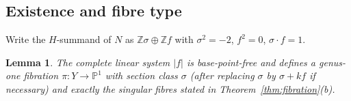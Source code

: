 \documentclass[11pt]{article}
\newtheorem{lemma}[theorem]{Lemma}
\newcommand{\PP}{\mathbb{P}}
\newcommand{\bZ}{\mathbb{Z}}
\begin{document}
\subsection{Existence and fibre type}

Write the $H$-summand of $N$ as $\bZ\sigma\oplus\bZ f$ with
$\sigma^2=-2$, $f^2=0$, $\sigma\cdot f=1$.

\begin{lemma}\label{lem:fibration}
The complete linear system $|f|$ is base-point-free and defines a genus-one
fibration $\pi\colon Y\to\PP^1$ with section class $\sigma$ (after replacing
$\sigma$ by $\sigma+kf$ if necessary) and exactly the singular fibres stated
in Theorem~\ref{thm:fibration}(b).
\end{lemma}

\end{document}
